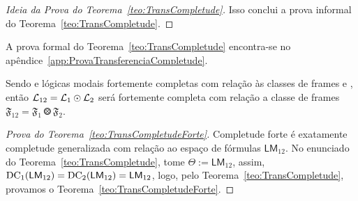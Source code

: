 \begin{proof}[Ideia da Prova do Teorema~\ref{teo:TransCompletude}]
                Isso conclui a prova informal do Teorema~\ref*{teo:TransCompletude}.
            \end{proof}

            A prova formal do Teorema~\ref{teo:TransCompletude} encontra-se no apêndice~\ref{app:ProvaTransferenciaCompletude}.


            \begin{teorema}
                \label{teo:TransCompletudeForte}
                Sendo  e  lógicas modais fortemente completas com relação às classes de frames  e ,
                então \(\mathcal{L}_{12} = \mathcal{L}_{1} \mathbin{\odot} \mathcal{L}_{2}\) será fortemente completa com relação a classe de frames \(\mathfrak{F}_{12} = \mathfrak{F}_1 \Otimes \mathfrak{F}_2\).
            \end{teorema}

            \begin{proof}[Prova do Teorema~\ref{teo:TransCompletudeForte}]
                Completude forte é exatamente completude generalizada com relação ao espaço de fórmulas \(\mathsf{LM}_{12}\). No enunciado do Teorema~\ref{teo:TransCompletude},
                tome \(\Theta := \mathsf{LM}_{12}\), assim, \(\operatorname{DC}_1(\mathsf{LM}_{12}) = \operatorname{DC}_2(\mathsf{LM}_{12}) = \mathsf{LM}_{12}\), logo, pelo
                Teorema~\ref{teo:TransCompletude}, provamos o Teorema~\ref{teo:TransCompletudeForte}.
            \end{proof}

